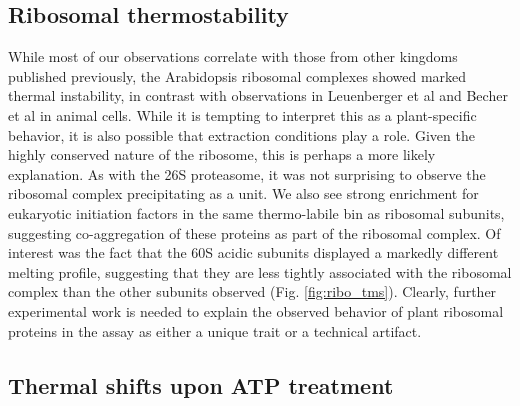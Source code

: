 \documentclass[11pt,letter]{article}\usepackage[]{graphicx}\usepackage[]{color}
\begin{document}
\subsection*{Ribosomal thermostability}

While most of our observations correlate with those from other kingdoms
published previously, the Arabidopsis ribosomal complexes showed marked
thermal instability, in contrast with observations in Leuenberger et al and
Becher et al \cite{leuenberger_cell-wide_2017,becher_pervasive_2018} in animal
cells. While it is tempting to interpret this as a plant-specific behavior, it
is also possible that extraction conditions play a role. Given the highly
conserved nature of the ribosome, this is perhaps a more likely explanation.
As with the 26S proteasome, it was not surprising to observe the ribosomal
complex precipitating as a unit. We also see strong enrichment for eukaryotic
initiation factors in the same thermo-labile bin as ribosomal subunits,
suggesting co-aggregation of these proteins as part of the ribosomal complex.
Of interest was the fact that the 60S acidic subunits displayed a markedly
different melting profile, suggesting that they are less tightly associated
with the ribosomal complex than the other subunits observed (Fig.
\ref{fig:ribo_tms}). Clearly, further experimental work is needed to explain
the observed behavior of plant ribosomal proteins in the assay as either a
unique trait or a technical artifact.

\subsection*{Thermal shifts upon ATP treatment}
\end{document}
